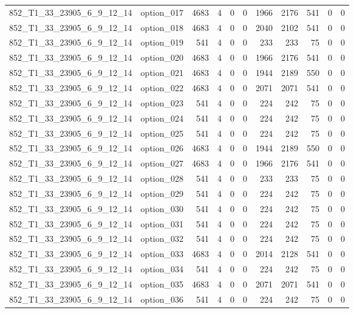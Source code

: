 \begin{tabular}{llrrrrrrrrr}
852\_T1\_33\_23905\_6\_9\_12\_14 & option\_017 & 4683 & 4 & 0 & 0 & 1966 & 2176 & 541 & 0 & 0 \\
852\_T1\_33\_23905\_6\_9\_12\_14 & option\_018 & 4683 & 4 & 0 & 0 & 2040 & 2102 & 541 & 0 & 0 \\
852\_T1\_33\_23905\_6\_9\_12\_14 & option\_019 & 541 & 4 & 0 & 0 & 233 & 233 & 75 & 0 & 0 \\
852\_T1\_33\_23905\_6\_9\_12\_14 & option\_020 & 4683 & 4 & 0 & 0 & 1966 & 2176 & 541 & 0 & 0 \\
852\_T1\_33\_23905\_6\_9\_12\_14 & option\_021 & 4683 & 4 & 0 & 0 & 1944 & 2189 & 550 & 0 & 0 \\
852\_T1\_33\_23905\_6\_9\_12\_14 & option\_022 & 4683 & 4 & 0 & 0 & 2071 & 2071 & 541 & 0 & 0 \\
852\_T1\_33\_23905\_6\_9\_12\_14 & option\_023 & 541 & 4 & 0 & 0 & 224 & 242 & 75 & 0 & 0 \\
852\_T1\_33\_23905\_6\_9\_12\_14 & option\_024 & 541 & 4 & 0 & 0 & 224 & 242 & 75 & 0 & 0 \\
852\_T1\_33\_23905\_6\_9\_12\_14 & option\_025 & 541 & 4 & 0 & 0 & 224 & 242 & 75 & 0 & 0 \\
852\_T1\_33\_23905\_6\_9\_12\_14 & option\_026 & 4683 & 4 & 0 & 0 & 1944 & 2189 & 550 & 0 & 0 \\
852\_T1\_33\_23905\_6\_9\_12\_14 & option\_027 & 4683 & 4 & 0 & 0 & 1966 & 2176 & 541 & 0 & 0 \\
852\_T1\_33\_23905\_6\_9\_12\_14 & option\_028 & 541 & 4 & 0 & 0 & 233 & 233 & 75 & 0 & 0 \\
852\_T1\_33\_23905\_6\_9\_12\_14 & option\_029 & 541 & 4 & 0 & 0 & 224 & 242 & 75 & 0 & 0 \\
852\_T1\_33\_23905\_6\_9\_12\_14 & option\_030 & 541 & 4 & 0 & 0 & 224 & 242 & 75 & 0 & 0 \\
852\_T1\_33\_23905\_6\_9\_12\_14 & option\_031 & 541 & 4 & 0 & 0 & 224 & 242 & 75 & 0 & 0 \\
852\_T1\_33\_23905\_6\_9\_12\_14 & option\_032 & 541 & 4 & 0 & 0 & 224 & 242 & 75 & 0 & 0 \\
852\_T1\_33\_23905\_6\_9\_12\_14 & option\_033 & 4683 & 4 & 0 & 0 & 2014 & 2128 & 541 & 0 & 0 \\
852\_T1\_33\_23905\_6\_9\_12\_14 & option\_034 & 541 & 4 & 0 & 0 & 224 & 242 & 75 & 0 & 0 \\
852\_T1\_33\_23905\_6\_9\_12\_14 & option\_035 & 4683 & 4 & 0 & 0 & 2071 & 2071 & 541 & 0 & 0 \\
852\_T1\_33\_23905\_6\_9\_12\_14 & option\_036 & 541 & 4 & 0 & 0 & 224 & 242 & 75 & 0 & 0 \\

\end{tabular}
